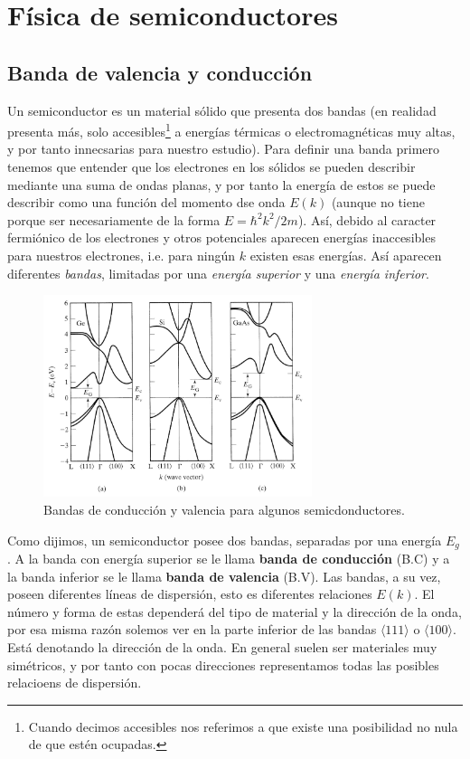 \chapter{Física de semiconductores}

\section{Banda de valencia y conducción}

Un semiconductor es un material sólido que presenta dos bandas (en realidad presenta más, solo accesibles\footnote{Cuando decimos accesibles nos referimos a que existe una posibilidad no nula de que estén ocupadas.} a energías térmicas o electromagnéticas muy altas, y por tanto innecsarias para nuestro estudio). Para definir una banda primero tenemos que entender que los electrones en los sólidos se pueden describir mediante una suma de ondas planas, y por tanto la energía de estos se puede describir como una función del momento dse onda $E(k)$ (aunque no tiene porque ser necesariamente de la forma $E=\hbar^2 k^2/2m$). Así, debido al caracter fermiónico de los electrones y otros potenciales aparecen energías inaccesibles para nuestros electrones, i.e. para ningún $k$ existen esas energías. Así aparecen diferentes \textit{bandas}, limitadas por una \textit{energía superior} y una \textit{energía inferior}.

\begin{figure}[h!] \centering
	\includegraphics[width=0.7\textwidth]{Cuerpo/Ch_01/01_01.png}
	\caption{Bandas de conducción y valencia para algunos semicdonductores.}
\end{figure}

Como dijimos, un semiconductor posee dos bandas, separadas por una energía $E_g$. A la banda con energía superior se le llama \textbf{banda de conducción} (B.C) y a la banda inferior se le llama \textbf{banda de valencia} (B.V). Las bandas, a su vez, poseen diferentes líneas de dispersión, esto es diferentes relaciones $E(k)$. El número y forma de estas dependerá del tipo de material y la dirección de la onda, por esa misma razón solemos ver en la parte inferior de las bandas $\langle 111\rangle $ o $\langle 100\rangle$. Está denotando la dirección de la onda. En general suelen ser materiales muy simétricos, y por tanto con pocas direcciones representamos todas las posibles relacioens de dispersión.

